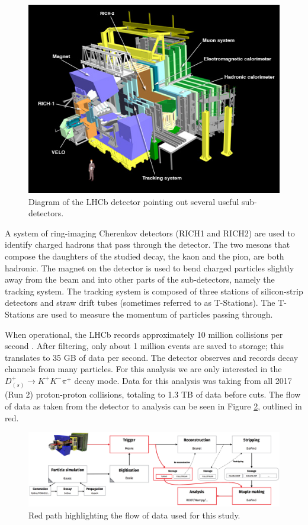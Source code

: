 \documentclass[12pt, letterpaper]{article}
\begin{document}
\begin{figure}[h!]
\centering
\includegraphics[width=0.6\linewidth]{detector.jpg}
\caption{Diagram of the LHCb detector pointing out several useful sub-detectors.}
\label{fig:detector}
\end{figure}

A system of ring-imaging Cherenkov detectors (RICH1 and RICH2) are used to identify charged hadrons that pass through the detector. The two mesons that compose the daughters of the studied decay, the kaon and the pion,  are both hadronic. The magnet on the detector is used to bend charged particles slightly away from the beam and into other parts of the sub-detectors, namely the tracking system. The tracking system is composed of three stations of silicon-strip detectors and straw drift tubes (sometimes referred to as T-Stations). The T-Stations are used to measure the momentum of particles passing through.

When operational, the LHCb records approximately 10 million collisions per
second \cite{events}. After filtering, only about 1 million events are saved to storage; this translates to 35 GB of data per second. The detector observes and records decay channels from many particles. For this analysis we are only interested in the $D^{+}_{(s)} \rightarrow K^{+}K^{-}\pi^{+}$ decay mode. Data for this analysis was taking from all 2017 (Run 2) proton-proton collisions, totaling to 1.3 TB of data before cuts. The flow of data as taken from the detector to analysis can be seen in Figure \ref{fig:dataflow}, outlined in red.
 



\begin{figure}[h!]
\centering
\includegraphics[width=1\linewidth]{lhcb_run_2_data_flow.png}
\caption{Red path highlighting the flow of data used for this study.}
\label{fig:dataflow}
\end{figure}
\end{document}
